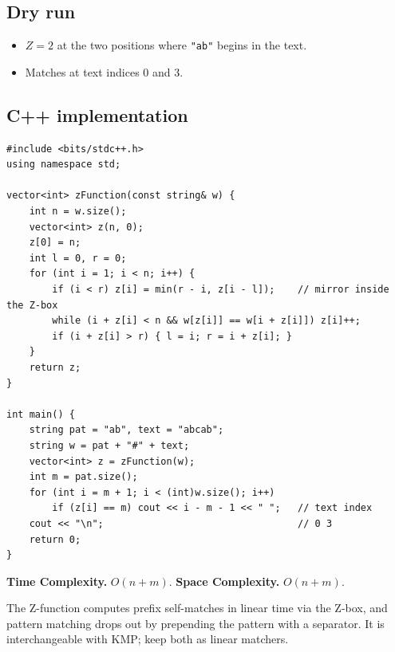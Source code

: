 \subsection*{Dry run}


\begin{itemize}
  \item $Z=2$ at the two positions where \texttt{"ab"} begins in the text.
  \item Matches at text indices $0$ and $3$.
\end{itemize}

\subsection*{C++ implementation}

\begin{lstlisting}
#include <bits/stdc++.h>
using namespace std;

vector<int> zFunction(const string& w) {
    int n = w.size();
    vector<int> z(n, 0);
    z[0] = n;
    int l = 0, r = 0;
    for (int i = 1; i < n; i++) {
        if (i < r) z[i] = min(r - i, z[i - l]);    // mirror inside the Z-box
        while (i + z[i] < n && w[z[i]] == w[i + z[i]]) z[i]++;
        if (i + z[i] > r) { l = i; r = i + z[i]; }
    }
    return z;
}

int main() {
    string pat = "ab", text = "abcab";
    string w = pat + "#" + text;
    vector<int> z = zFunction(w);
    int m = pat.size();
    for (int i = m + 1; i < (int)w.size(); i++)
        if (z[i] == m) cout << i - m - 1 << " ";   // text index
    cout << "\n";                                  // 0 3
    return 0;
}
\end{lstlisting}

\begin{complexitybox}
\textbf{Time Complexity.} $O(n+m)$. \textbf{Space Complexity.} $O(n+m)$.
\end{complexitybox}

\begin{takeawaybox}
The Z-function computes prefix self-matches in linear time via the Z-box,
and pattern matching drops out by prepending the pattern with a separator.
It is interchangeable with KMP; keep both as linear matchers.
\end{takeawaybox}

